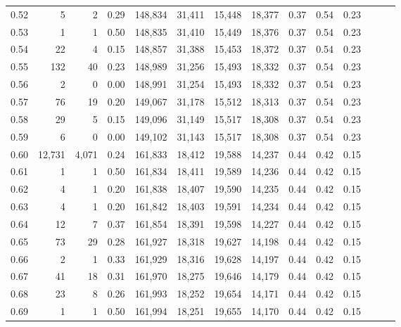 \begin{tabular}{rrrrrrrrrrrrrr}
0.52 &       5 &      2 &  0.29 &  148,834 &   31,411 &  15,448 &  18,377 &  0.37 &  0.54 &      0.23 \\
0.53 &       1 &      1 &  0.50 &  148,835 &   31,410 &  15,449 &  18,376 &  0.37 &  0.54 &      0.23 \\
0.54 &      22 &      4 &  0.15 &  148,857 &   31,388 &  15,453 &  18,372 &  0.37 &  0.54 &      0.23 \\
0.55 &     132 &     40 &  0.23 &  148,989 &   31,256 &  15,493 &  18,332 &  0.37 &  0.54 &      0.23 \\
0.56 &       2 &      0 &  0.00 &  148,991 &   31,254 &  15,493 &  18,332 &  0.37 &  0.54 &      0.23 \\
0.57 &      76 &     19 &  0.20 &  149,067 &   31,178 &  15,512 &  18,313 &  0.37 &  0.54 &      0.23 \\
0.58 &      29 &      5 &  0.15 &  149,096 &   31,149 &  15,517 &  18,308 &  0.37 &  0.54 &      0.23 \\
0.59 &       6 &      0 &  0.00 &  149,102 &   31,143 &  15,517 &  18,308 &  0.37 &  0.54 &      0.23 \\
0.60 &  12,731 &  4,071 &  0.24 &  161,833 &   18,412 &  19,588 &  14,237 &  0.44 &  0.42 &      0.15 \\
0.61 &       1 &      1 &  0.50 &  161,834 &   18,411 &  19,589 &  14,236 &  0.44 &  0.42 &      0.15 \\
0.62 &       4 &      1 &  0.20 &  161,838 &   18,407 &  19,590 &  14,235 &  0.44 &  0.42 &      0.15 \\
0.63 &       4 &      1 &  0.20 &  161,842 &   18,403 &  19,591 &  14,234 &  0.44 &  0.42 &      0.15 \\
0.64 &      12 &      7 &  0.37 &  161,854 &   18,391 &  19,598 &  14,227 &  0.44 &  0.42 &      0.15 \\
0.65 &      73 &     29 &  0.28 &  161,927 &   18,318 &  19,627 &  14,198 &  0.44 &  0.42 &      0.15 \\
0.66 &       2 &      1 &  0.33 &  161,929 &   18,316 &  19,628 &  14,197 &  0.44 &  0.42 &      0.15 \\
0.67 &      41 &     18 &  0.31 &  161,970 &   18,275 &  19,646 &  14,179 &  0.44 &  0.42 &      0.15 \\
0.68 &      23 &      8 &  0.26 &  161,993 &   18,252 &  19,654 &  14,171 &  0.44 &  0.42 &      0.15 \\
0.69 &       1 &      1 &  0.50 &  161,994 &   18,251 &  19,655 &  14,170 &  0.44 &  0.42 &      0.15 \\

\end{tabular}
